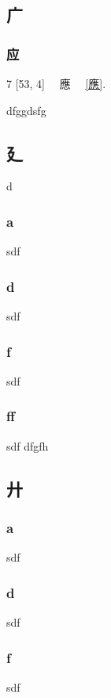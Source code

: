 \subsection{\ene  广} \label{cincuentaytress} 
\subsubsection{\ene 应}\label{应} %
{\Large 7 [53, 4]} \abreviacion\ \enlugarde\ {\ene  應} \vease\ \textnumero\ \ref{應}.%

\setcounter{subsss}{\value{subsubsection}} dfggdsfg 
\subsection{\ene  廴} \label{cincuentaycuatros}d

\subsubsection{a}sdf
\subsubsection{d}sdf
\subsubsection{f}sdf
\subsubsection{ff}sdf
\setcounter{subsss}{\value{subsubsection}} dfgfh 
\subsection{\ene  廾} \label{cincuentaycincos}

\subsubsection{a}sdf
\subsubsection{d}sdf
\subsubsection{f}sdf
